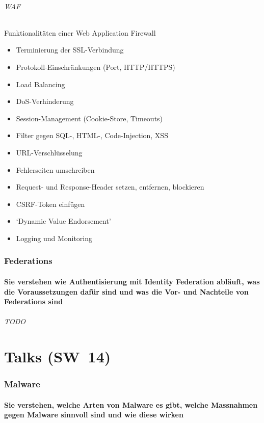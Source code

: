 \documentclass[10pt,a4paper]{article}
\begin{document}
\paragraph*{WAF}Funktionalitäten einer Web Application Firewall
\begin{itemize}[noitemsep,topsep=0pt,leftmargin=*]
    \item Terminierung der SSL-Verbindung
    \item Protokoll-Einschränkungen (Port, HTTP/HTTPS)
    \item Load Balancing
    \item DoS-Verhinderung
    \item Session-Management (Cookie-Store, Timeouts)
    \item Filter gegen SQL-, HTML-, Code-Injection, XSS
    \item URL-Verschlüsselung
    \item Fehlerseiten umschreiben
    \item Request- und Response-Header setzen, entfernen, blockieren
    \item CSRF-Token einfügen
    \item `Dynamic Value Endorsement'
    \item Logging und Monitoring
\end{itemize}


\section{Federations}
\subsection*{Sie verstehen wie Authentisierung mit Identity Federation abläuft, was die Voraussetzungen dafür sind und was die Vor- und Nachteile von Federations sind}
\paragraph*{TODO}


\part{Talks (SW~14)}
\section{Malware}
\subsection*{Sie verstehen, welche Arten von Malware es gibt, welche Massnahmen gegen Malware sinnvoll sind und wie diese wirken}
\end{document}
